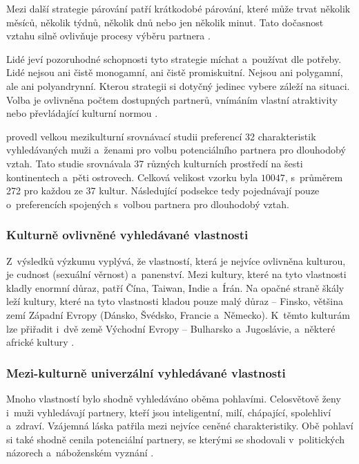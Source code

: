 \documentclass[a4paper, 12pt, notitlepage, oneside, numbers=noenddot]{report}
\begin{document}
Mezi další strategie párování patří krátkodobé párování, které může
trvat několik měsíců, několik týdnů, několik dnů nebo jen několik
minut.  Tato dočasnost vztahu silně ovlivňuje procesy výběru partnera
\citep{Buss2007}.

Lidé jeví pozoruhodné schopnosti tyto strategie míchat a~používat dle
potřeby.  Lidé nejsou ani čistě monogamní, ani čistě promiskuitní.
Nejsou ani polygamní, ale ani poly\-an\-dryn\-ní.  Kterou strategii si
dotyčný jedinec vybere záleží na situaci.  Volba je ovlivněna počtem
dostupných partnerů, vnímáním vlastní atraktivity nebo převládající
kulturní normou \citep{Buss2007,Murstein1970}.

\citet{BussEtAl1990,Buss2007} provedl velkou mezikulturní srovnávací
studii pre\-fe\-rencí 32 charakteristik vyhledávaných muži a~ženami pro
volbu potenciálního partnera pro dlouhodobý vztah.  Tato studie
srovnávala 37 různých kulturních prostředí na šesti kontinentech
a~pěti ostrovech.  Celková velikost vzorku byla $10047$, s~průměrem
272 pro každou ze 37 kultur.  Následující podsekce tedy pojednávají
pouze o~preferencích spojených s~volbou partnera pro dlouhodobý vztah.

\subsubsection{Kulturně ovlivněné vyhledávané vlastnosti}

Z~výsledků výzkumu vyplývá, že vlastností, která je nejvíce ovlivněna
kulturou, je cudnost (sexuální věrnost) a~panenství.  Mezi kultury,
které na tyto vlastnosti kladly enormní důraz, patří Čína, Taiwan,
Indie a~Írán.  Na opačné straně škály leží kultury, které na tyto
vlastnosti kladou pouze malý důraz -- Finsko, většina zemí Západní
Evropy (Dánsko, Švédsko, Francie a~Německo).  K~těmto kulturám lze
přiřadit i~dvě země Východní Evropy -- Bulharsko a~Jugoslávie,
a~některé africké kultury \citep{BussEtAl1990,Buss2007}.

\subsubsection{Mezi-kulturně univerzální vyhledávané vlastnosti}

Mnoho vlastností bylo shodně vyhledáváno oběma pohlavími.  Celosvětově
ženy i~muži vyhledávají partnery, kteří jsou inteligentní, milí,
chápající, spolehliví a~zdraví.  Vzájemná láska patřila mezi nejvíce
ceněné charakteristiky.  Obě pohlaví si také shodně cenila
potenciální partnery, se kterými se shodovali v~politických názorech
a~náboženském vyznání \citep{Buss2007}.
\end{document}
